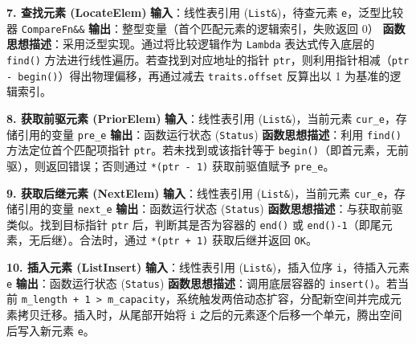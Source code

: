 \documentclass[supercite]{Experimental_Report}
\theoremstyle{definition}
\begin{document}
\vspace{0.5em}
\noindent\textbf{7. 查找元素 (LocateElem)}
\newline\textbf{输入}：线性表引用 (\texttt{List\&})，待查元素 \texttt{e}，泛型比较器 \texttt{CompareFn\&\&}
\newline\textbf{输出}：整型变量（首个匹配元素的逻辑索引，失败返回 0）
\newline\textbf{函数思想描述}：采用泛型实现。通过将比较逻辑作为 \texttt{Lambda} 表达式传入底层的 \texttt{find()} 方法进行线性遍历。若查找到对应地址的指针 \texttt{ptr}，则利用指针相减（\texttt{ptr - begin()}）得出物理偏移，再通过减去 \texttt{traits.offset} 反算出以 1 为基准的逻辑索引。

\vspace{0.5em}
\noindent\textbf{8. 获取前驱元素 (PriorElem)}
\newline\textbf{输入}：线性表引用 (\texttt{List\&})，当前元素 \texttt{cur\_e}，存储引用的变量 \texttt{pre\_e}
\newline\textbf{输出}：函数运行状态 (\texttt{Status})
\newline\textbf{函数思想描述}：利用 \texttt{find()} 方法定位首个匹配项指针 \texttt{ptr}。若未找到或该指针等于 \texttt{begin()}（即首元素，无前驱），则返回错误；否则通过 \texttt{*(ptr - 1)} 获取前驱值赋予 \texttt{pre\_e}。

\vspace{0.5em}
\noindent\textbf{9. 获取后继元素 (NextElem)}
\newline\textbf{输入}：线性表引用 (\texttt{List\&})，当前元素 \texttt{cur\_e}，存储引用的变量 \texttt{next\_e}
\newline\textbf{输出}：函数运行状态 (\texttt{Status})
\newline\textbf{函数思想描述}：与获取前驱类似。找到目标指针 \texttt{ptr} 后，判断其是否为容器的 \texttt{end()} 或 \texttt{end()-1}（即尾元素，无后继）。合法时，通过 \texttt{*(ptr + 1)} 获取后继并返回 \texttt{OK}。

\vspace{0.5em}
\noindent\textbf{10. 插入元素 (ListInsert)}
\newline\textbf{输入}：线性表引用 (\texttt{List\&})，插入位序 \texttt{i}，待插入元素 \texttt{e}
\newline\textbf{输出}：函数运行状态 (\texttt{Status})
\newline\textbf{函数思想描述}：调用底层容器的 \texttt{insert()}。若当前 \texttt{m\_length + 1 > m\_capacity}，系统触发两倍动态扩容，分配新空间并完成元素拷贝迁移。插入时，从尾部开始将 \texttt{i} 之后的元素逐个后移一个单元，腾出空间后写入新元素 \texttt{e}。
\end{document}
